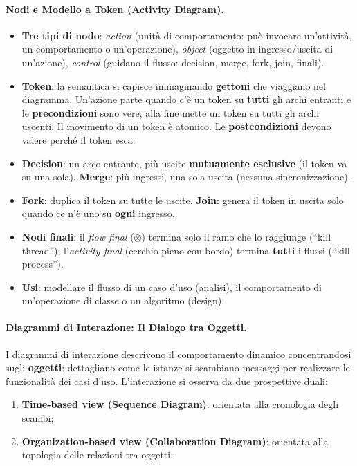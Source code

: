 \documentclass[12pt]{extarticle}
\begin{document}
\paragraph{Nodi e Modello a Token (Activity Diagram).}
\begin{itemize}
    \item \textbf{Tre tipi di nodo}: \textit{action} (unità di comportamento: può invocare un'attività, un comportamento o un'operazione), \textit{object} (oggetto in ingresso/uscita di un'azione), \textit{control} (guidano il flusso: decision, merge, fork, join, finali).
    \item \textbf{Token}: la semantica si capisce immaginando \textbf{gettoni} che viaggiano nel diagramma. Un'azione parte quando c'è un token su \textbf{tutti} gli archi entranti e le \textbf{precondizioni} sono vere; alla fine mette un token su tutti gli archi uscenti. Il movimento di un token è atomico. Le \textbf{postcondizioni} devono valere perché il token esca.
    \item \textbf{Decision}: un arco entrante, più uscite \textbf{mutuamente esclusive} (il token va su una sola). \textbf{Merge}: più ingressi, una sola uscita (nessuna sincronizzazione).
    \item \textbf{Fork}: duplica il token su tutte le uscite. \textbf{Join}: genera il token in uscita solo quando ce n'è uno su \textbf{ogni} ingresso.
    \item \textbf{Nodi finali}: il \textit{flow final} ($\otimes$) termina solo il ramo che lo raggiunge (``kill thread''); l'\textit{activity final} (cerchio pieno con bordo) termina \textbf{tutti} i flussi (``kill process'').
    \item \textbf{Usi}: modellare il flusso di un caso d'uso (analisi), il comportamento di un'operazione di classe o un algoritmo (design).
\end{itemize}

\paragraph{Diagrammi di Interazione: Il Dialogo tra Oggetti.}
I diagrammi di interazione descrivono il comportamento dinamico concentrandosi sugli \textbf{oggetti}: dettagliano come le istanze si scambiano messaggi per realizzare le funzionalità dei casi d'uso. L'interazione si osserva da due prospettive duali:
\begin{enumerate}
    \item \textbf{Time-based view (Sequence Diagram)}: orientata alla cronologia degli scambi;
    \item \textbf{Organization-based view (Collaboration Diagram)}: orientata alla topologia delle relazioni tra oggetti.
\end{enumerate}
\end{document}

